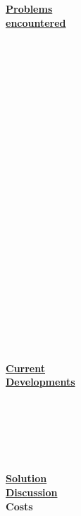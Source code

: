 \begin{parcolumns}[colwidths={1=2.5 cm, 2=10 cm, 3=2.5cm}]{3}
{			\\\\\\\\\\\\ \\ \\\\\\ \\ \\ \underline{\textbf{Problems}}\\ \underline{\textbf{encountered}} \\ \\ \\ \\\\ \\ \\ \\ \\ \\ \\ \\ \\ \\\\ \\\ \\ \\ \\ \ \\ \\ \\ \\ \\ \\ \underline{\textbf{Current}}\\ \underline{\textbf{Developments}}\\\\ \\ \\\\ \\ \\  \underline{\textbf{Solution}}\\ \underline{\textbf{Discussion}}\\ \textbf{Costs}
}
\end{parcolumns}

